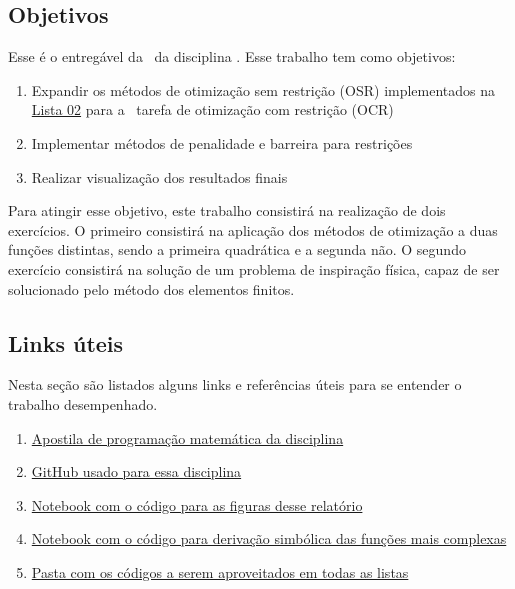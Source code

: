 \documentclass[10pt, a4paper]{article}
\begin{document}
\subsection{Objetivos}

Esse é o entregável da \TITLE \ da disciplina \DISCIPLINE. Esse trabalho tem como objetivos:

\begin{enumerate}
  \item Expandir os métodos de otimização sem restrição (OSR) implementados na \href{https://github.com/prj-phcp/MEC2403_Activities/blob/master/Lista2/Lista2.pdf}{Lista 02} para a \
  tarefa de otimização com restrição (OCR)
  \item Implementar métodos de penalidade e barreira para restrições
  \item Realizar visualização dos resultados finais
\end{enumerate}

Para atingir esse objetivo, este trabalho consistirá na realização de dois exercícios. O primeiro consistirá na aplicação dos
métodos de otimização a duas funções distintas, sendo a primeira quadrática e a segunda não. O segundo exercício consistirá 
na solução de um problema de inspiração física, capaz de ser solucionado pelo método dos elementos finitos.

\subsection{Links úteis}\label{links}

Nesta seção são listados alguns links e referências úteis para se entender o trabalho desempenhado.

\begin{enumerate}
  \item \href{https://web.tecgraf.puc-rio.br/~ivan/MEC2403/ProgMatematica_VazPereiraMenezes-Ago2012.pdf}{Apostila de programação matemática da disciplina}
  \item \href{https://github.com/prj-phcp/MEC2403_Activities}{GitHub usado para essa disciplina}
  \item \href{https://github.com/prj-phcp/MEC2403_Activities/blob/master/Trabalho2/Trabalho2.ipynb}{Notebook com o código para as figuras desse relatório}
  \item \href{https://github.com/prj-phcp/MEC2403_Activities/blob/master/Trabalho2/Derivadas.ipynb}{Notebook com o código para derivação simbólica das funções mais complexas}
  \item \href{https://github.com/prj-phcp/MEC2403_Activities/blob/master/packages}{Pasta com os códigos a serem aproveitados em todas as listas}
\end{enumerate}
\end{document}
